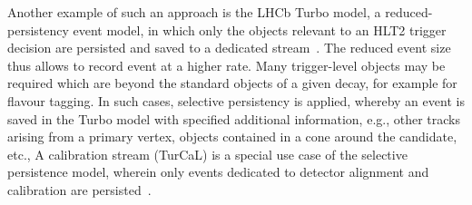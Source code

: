 Another example of such an approach is the LHCb Turbo model, a reduced-persistency event model, in which only the objects relevant to an HLT2 trigger decision are persisted and saved to a dedicated stream~\cite{Aaij:2016rxn}. The reduced event size thus allows to record event at a higher rate. Many trigger-level objects may be required which are beyond the standard objects of a given decay, for example for flavour tagging. In such cases, selective persistency is applied, whereby an event is saved in the Turbo model with specified additional information, e.g., other tracks arising from a primary vertex, objects contained in a cone around the candidate, etc., A calibration stream (TurCaL) is a special use case of the selective persistence model, wherein only events dedicated to detector alignment and calibration are persisted~\cite{Aaij:2019uij}.








